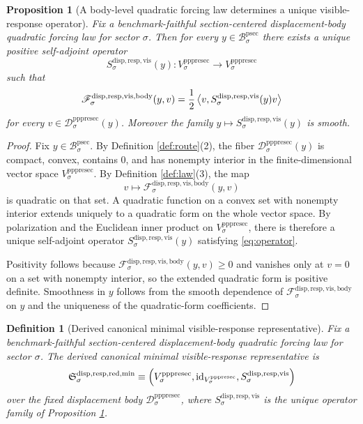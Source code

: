 \documentclass[11pt]{article}
\newcommand{\ProtoSectionBody}[1]{\mathcal B_{#1}^{\mathrm{psec}}}
\newcommand{\PrePreProtoSectionVertical}[1]{V_{#1}^{\mathrm{pppresec}}}
\newcommand{\PrePreProtoSectionResidualBody}[1]{\mathcal D_{#1}^{\mathrm{pppresec}}}
\newcommand{\VisibleBodyForcingLaw}[1]{\mathscr F_{#1}^{\mathrm{disp,resp,vis,body}}}
\newcommand{\VisibleResponseOperator}[1]{S_{#1}^{\mathrm{disp,resp,vis}}}
\newcommand{\MinimalReducedStructure}{\mathfrak S^{\mathrm{disp,resp,red,min}}}
\newtheorem{definition}{Definition}
\newtheorem{proposition}{Proposition}
\begin{document}
\begin{proposition}[A body-level quadratic forcing law determines a unique visible-response operator]
\label{prop:operator}
Fix a benchmark-faithful section-centered displacement-body quadratic forcing law for sector \(\sigma\). Then for every \(y\in\ProtoSectionBody{\sigma}\) there exists a unique positive self-adjoint operator
\[
\VisibleResponseOperator{\sigma}(y):
\PrePreProtoSectionVertical{\sigma}\to\PrePreProtoSectionVertical{\sigma}
\]
such that
\begin{equation}
\VisibleBodyForcingLaw{\sigma}(y,v)
=
\frac{1}{2}
\ev{v,\VisibleResponseOperator{\sigma}(y)v}
\label{eq:operator}
\end{equation}
for every \(v\in\PrePreProtoSectionResidualBody{\sigma}(y)\). Moreover the family \(y\mapsto \VisibleResponseOperator{\sigma}(y)\) is smooth.
\end{proposition}

\begin{proof}
Fix \(y\in\ProtoSectionBody{\sigma}\). By Definition \ref{def:route}(2), the fiber \(\PrePreProtoSectionResidualBody{\sigma}(y)\) is compact, convex, contains \(0\), and has nonempty interior in the finite-dimensional vector space \(\PrePreProtoSectionVertical{\sigma}\). By Definition \ref{def:law}(3), the map
\[
v\mapsto \VisibleBodyForcingLaw{\sigma}(y,v)
\]
is quadratic on that set. A quadratic function on a convex set with nonempty interior extends uniquely to a quadratic form on the whole vector space. By polarization and the Euclidean inner product on \(\PrePreProtoSectionVertical{\sigma}\), there is therefore a unique self-adjoint operator \(\VisibleResponseOperator{\sigma}(y)\) satisfying \eqref{eq:operator}.

Positivity follows because \(\VisibleBodyForcingLaw{\sigma}(y,v)\ge 0\) and vanishes only at \(v=0\) on a set with nonempty interior, so the extended quadratic form is positive definite. Smoothness in \(y\) follows from the smooth dependence of \(\VisibleBodyForcingLaw{\sigma}\) on \(y\) and the uniqueness of the quadratic-form coefficients.
\end{proof}

\begin{definition}[Derived canonical minimal visible-response representative]
\label{def:minimal}
Fix a benchmark-faithful section-centered displacement-body quadratic forcing law for sector \(\sigma\). The \emph{derived canonical minimal visible-response representative} is
\[
\MinimalReducedStructure_{\sigma}
\equiv
\Bigl(
\PrePreProtoSectionVertical{\sigma},
\mathrm{id}_{\PrePreProtoSectionVertical{\sigma}},
\VisibleResponseOperator{\sigma}
\Bigr)
\]
over the fixed displacement body \(\PrePreProtoSectionResidualBody{\sigma}\), where \(\VisibleResponseOperator{\sigma}\) is the unique operator family of Proposition \ref{prop:operator}.
\end{definition}
\end{document}
